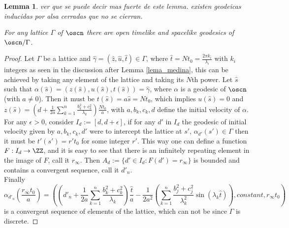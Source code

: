 \documentclass[11pt]{amsart}
\theoremstyle{plain}
\newtheorem{lem}[thm]{Lemma}
\theoremstyle{definition}
\theoremstyle{remark}
\begin{document}
\begin{lem}
    ver que se puede decir mas fuerte de este lemma. existen geodeicas inducidas por alsa cerradas que no se cierran.

	For any lattice $\Gamma$ of $\oscn$ there are open timelike and spacelike geodesics of $\oscn/ \Gamma$.
\end{lem}

\begin{proof}
Let $\Gamma$ be a lattice and $\hat{\gamma}=(\hat{z},\hat{u},\hat{t}) \in \Gamma$, where $\hat{t}=N t_0 = \frac{2 \pi k_i}{\lambda_i}$ with $k_i$ integers as seen in the discussion after Lemma \ref{lema_medina}, this can be achieved by taking any element of the lattice and taking its $N$th power. Let $\hat{s}$ such that $\alpha(\hat{s})=(z(\hat{s}),u(\hat{s}),t(\hat{s})) = \hat{\gamma}$, where $\alpha$ is a geodesic of $\oscn$ (with $a \neq 0$). Then it must be $t(\hat{s}) = a \hat{s} = N t_0$, which implies $u(\hat{s})=0$ and $z(\hat{s}) = (d + \frac{1}{2 a} \sum^n_{k=1} \frac{b_k^2+ c_k^2}{\lambda_k}) \frac{N t_0}{a}$, with $a, b_k, c_k, d$ define the initial velocity of $\alpha$. \\
    
    For any $\epsilon >0$, consider $I_d := [d, d+ \epsilon]$, if for any $d'$ in $I_d$ the geodesic of initial velocity given by $a, b_k,c_k, d'$ were to intercept the lattice at $s'$, $\alpha_{d'}(s') \in \Gamma$ then it must be $t'(s') = r' t_0$ for some integer $r'$. This way one can define a function $F: I_d \to \ZZ$, and it is easy to see that there is an infinitely repeating element in the image of $F$, call it $r_{\infty}$. Then $A_d:= \{ d' \in I_d : F(d')= r_{\infty} \}$ is bounded and contains a convergent sequence, call it $d'_n$.\\
    
    Finally 
    \begin{equation*}
    \alpha_{d'_n}(\frac{r_{\infty} t_0}{a}) = \left( \left(d'_n + \frac{1}{2 a} \sum_{k=1}^{n} \frac{ b_{k}^{2}+c_k^{2}}{\lambda_k}\right)\frac{\hat{t}}{a}- \frac{1}{2 a^{2}} \left(  \sum_{k=1}^{n} \frac{b_{j}^{2}+c_j^2}{\lambda_k^{2}} \sin(\lambda_k \hat{t}) \right), constant, r_\infty t_0 \right)
    \end{equation*}
    is a convergent sequence of elements of the lattice, which can not be since $\Gamma$ is discrete.
    
\end{proof}


\end{document}
